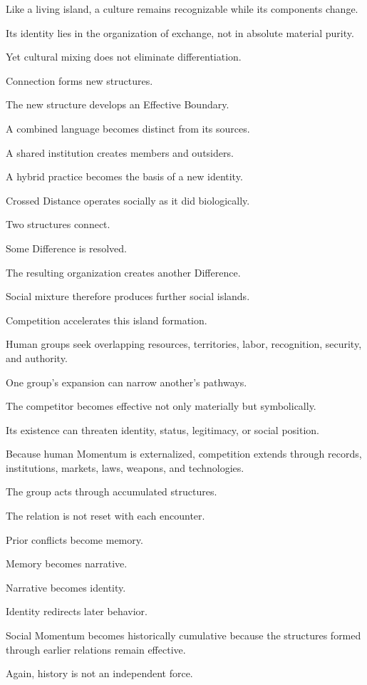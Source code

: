 Like a living island, a culture remains recognizable while its components change.

Its identity lies in the organization of exchange, not in absolute material purity.

Yet cultural mixing does not eliminate differentiation.

Connection forms new structures.

The new structure develops an Effective Boundary.

A combined language becomes distinct from its sources.

A shared institution creates members and outsiders.

A hybrid practice becomes the basis of a new identity.

Crossed Distance operates socially as it did biologically.

Two structures connect.

Some Difference is resolved.

The resulting organization creates another Difference.

Social mixture therefore produces further social islands.

Competition accelerates this island formation.

Human groups seek overlapping resources, territories, labor, recognition, security, and authority.

One group’s expansion can narrow another’s pathways.

The competitor becomes effective not only materially but symbolically.

Its existence can threaten identity, status, legitimacy, or social position.

Because human Momentum is externalized, competition extends through records, institutions, markets, laws, weapons, and technologies.

The group acts through accumulated structures.

The relation is not reset with each encounter.

Prior conflicts become memory.

Memory becomes narrative.

Narrative becomes identity.

Identity redirects later behavior.

Social Momentum becomes historically cumulative because the structures formed through earlier relations remain effective.

Again, history is not an independent force.

